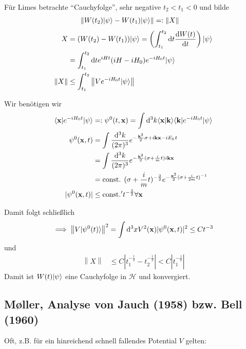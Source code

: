 \documentclass[11pt,a4paper]{report}
\newcommand{\norm}[1]{\left\lVert #1 \right\rVert}
\begin{document}
Für Limes betrachte ``Cauchyfolge'', sehr negative $t_2 < t_1 < 0$ und bilde
\begin{align*}
    \norm{W(t_2) \ket{\psi} - W(t_1) \ket{\psi}} &=: \norm{X}
\end{align*}
\begin{align*}
    X &= (W(t_2) - W(t_1)) \ket{\psi} = \left(\int_{t_1}^{t_2} \mathrm{d} t \frac{\mathrm{d} W(t)}{\mathrm{d}t}\right) \ket{\psi} \\
    &= \int_{t_1}^{t_2} \mathrm{d}t e^{i H t} (i H - i H_0) e^{-i H_0 t} \ket{\psi} \\
    \norm{X} &\leq \int_{t_1}^{t_2} \norm{V e^{-i H_0 t} \ket{\psi}}
\end{align*}

Wir benötigen wir 
\begin{align*}
    \langle \mathbf{x}|e^{-i H_0 t} | \psi\rangle &=: \psi^0(t, \mathbf{x}) = \int \mathrm{d}^3 k \langle \mathbf{x}|\mathbf{k}\rangle \langle \mathbf{k}|e^{-i H_0 t} | \psi\rangle \\
    \psi^0(\mathbf{x}, t) &= \int \frac{\mathrm{d}^3 k}{(2 \pi)^3} e^{-\frac{\mathbf{k}^2}{2} \sigma + i \mathbf{k} \mathbf{x} - i E_k t} \\
     &= \int \frac{\mathrm{d}^3 k}{(2 \pi)^3} e^{-\frac{\mathbf{k}^2}{2}( \sigma + \frac{i}{m}t) i \mathbf{k} \mathbf{x}} \\
     &= \text{const. } (\sigma + \frac{i}{m}t)^{-\frac{3}{2}} e^{-\frac{\mathbf{x}^2}{2}(\sigma + \frac{i}{2m}t)^{-1}} \\
    |\psi^0(\mathbf{x}, t)| &\leq \text{const.}' t^{-\frac{3}{2}} \forall \mathbf{x}
\end{align*}

Damit folgt schließlich
\begin{align*}
    \implies \norm{V \ket{\psi^0(t)}}^2 = \int \mathrm{d}^3 x V^2(\mathbf{x}) |\psi^0(\mathbf{x}, t)|^2 \leq C t^{-3}
\end{align*}
und 
\begin{align*}
    \norm{X} &\leq C |t_1^{-\frac{1}{2}} - t_2^{-\frac{1}{2}}| <  C |t_1^{-\frac{1}{2}}|
\end{align*}
Damit ist $W(t) |\psi\rangle$ eine Cauchyfolge in $\mathcal{H}$ und konvergiert.

\subsection{M{\o}ller, Analyse von Jauch (1958) bzw. Bell (1960)}

Oft, z.B. für ein hinreichend schnell fallendes Potential $V$ gelten:
\end{document}
